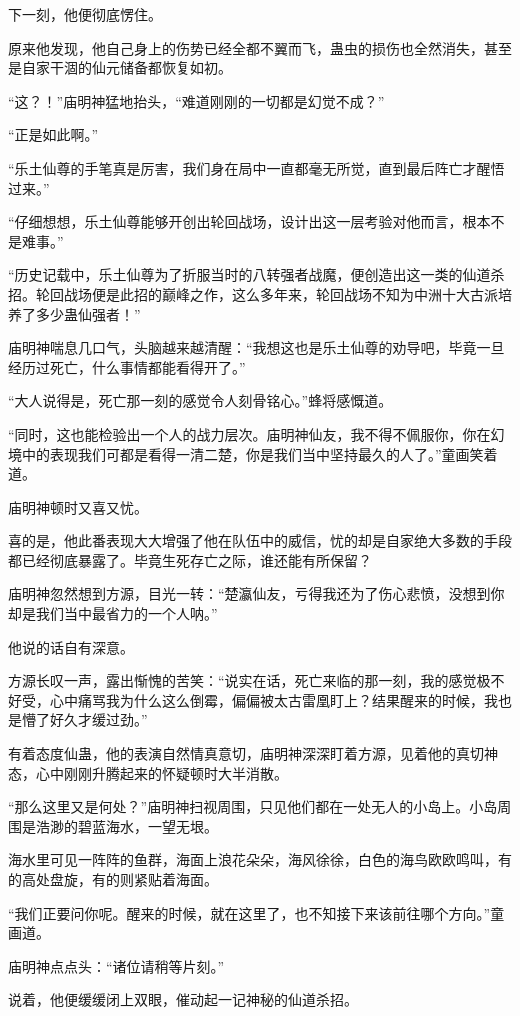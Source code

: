 \begin{this_body}
下一刻，他便彻底愣住。

原来他发现，他自己身上的伤势已经全都不翼而飞，蛊虫的损伤也全然消失，甚至是自家干涸的仙元储备都恢复如初。

“这？！”庙明神猛地抬头，“难道刚刚的一切都是幻觉不成？”

“正是如此啊。”

“乐土仙尊的手笔真是厉害，我们身在局中一直都毫无所觉，直到最后阵亡才醒悟过来。”

“仔细想想，乐土仙尊能够开创出轮回战场，设计出这一层考验对他而言，根本不是难事。”

“历史记载中，乐土仙尊为了折服当时的八转强者战魔，便创造出这一类的仙道杀招。轮回战场便是此招的巅峰之作，这么多年来，轮回战场不知为中洲十大古派培养了多少蛊仙强者！”

庙明神喘息几口气，头脑越来越清醒：“我想这也是乐土仙尊的劝导吧，毕竟一旦经历过死亡，什么事情都能看得开了。”

“大人说得是，死亡那一刻的感觉令人刻骨铭心。”蜂将感慨道。

“同时，这也能检验出一个人的战力层次。庙明神仙友，我不得不佩服你，你在幻境中的表现我们可都是看得一清二楚，你是我们当中坚持最久的人了。”童画笑着道。

庙明神顿时又喜又忧。

喜的是，他此番表现大大增强了他在队伍中的威信，忧的却是自家绝大多数的手段都已经彻底暴露了。毕竟生死存亡之际，谁还能有所保留？

庙明神忽然想到方源，目光一转：“楚瀛仙友，亏得我还为了伤心悲愤，没想到你却是我们当中最省力的一个人呐。”

他说的话自有深意。

方源长叹一声，露出惭愧的苦笑：“说实在话，死亡来临的那一刻，我的感觉极不好受，心中痛骂我为什么这么倒霉，偏偏被太古雷凰盯上？结果醒来的时候，我也是懵了好久才缓过劲。”

有着态度仙蛊，他的表演自然情真意切，庙明神深深盯着方源，见着他的真切神态，心中刚刚升腾起来的怀疑顿时大半消散。

“那么这里又是何处？”庙明神扫视周围，只见他们都在一处无人的小岛上。小岛周围是浩渺的碧蓝海水，一望无垠。

海水里可见一阵阵的鱼群，海面上浪花朵朵，海风徐徐，白色的海鸟欧欧鸣叫，有的高处盘旋，有的则紧贴着海面。

“我们正要问你呢。醒来的时候，就在这里了，也不知接下来该前往哪个方向。”童画道。

庙明神点点头：“诸位请稍等片刻。”

说着，他便缓缓闭上双眼，催动起一记神秘的仙道杀招。


\end{this_body}
